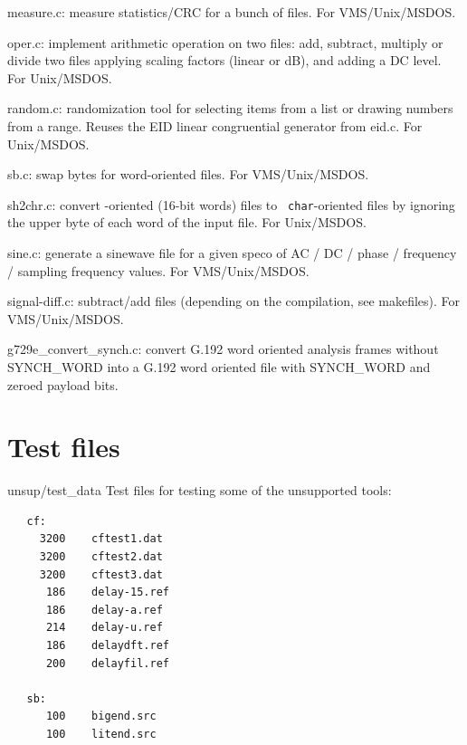 \begin{Descr}{40mm}
\item[measure.c:]
        measure statistics/CRC for a bunch of files.  For
        VMS/Unix/MSDOS.

\item[oper.c:]
            implement arithmetic operation on two files: add,
            subtract, multiply or divide two files applying
            scaling factors (linear or dB), and adding a DC
            level. For Unix/MSDOS.

\item[random.c:]
            randomization tool for selecting items from a list or
            drawing numbers from a range. Reuses the EID linear
            congruential generator from eid.c. For Unix/MSDOS.

\item[sb.c:]
        swap bytes for word-oriented files. For
        VMS/Unix/MSDOS.

\item[sh2chr.c:]
           convert \short-oriented (16-bit words) files to {\tt
           char}-oriented files by ignoring the upper byte of each
           word of the input file. For Unix/MSDOS.

\item[sine.c:]
        generate a sinewave file for a given speco of AC / DC / phase / frequency / sampling frequency values.
        For VMS/Unix/MSDOS.

\item[signal-diff.c:]
        subtract/add files (depending on the compilation, see makefiles). For VMS/Unix/MSDOS.


\item[g729e\_convert\_synch.c:]
        convert G.192 word oriented analysis 
        frames without SYNCH\_WORD into a G.192 word oriented 
        file with SYNCH\_WORD and zeroed payload bits. 
         
\end{Descr}


\section{Test files}

\begin{Descr}{40mm}
\item[unsup/test\_data]
Test files for testing some of the unsupported tools: \\
    {\tt\begin{verbatim}
   cf:
     3200    cftest1.dat
     3200    cftest2.dat
     3200    cftest3.dat
      186    delay-15.ref
      186    delay-a.ref
      214    delay-u.ref
      186    delaydft.ref
      200    delayfil.ref

   sb:
      100    bigend.src
      100    litend.src

        \end{verbatim}}
\end{Descr}


